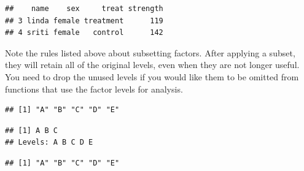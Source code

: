 \documentclass[]{book}
\newenvironment{Shaded}{\begin{snugshade}}{\end{snugshade}}
\newcommand{\DataTypeTok}[1]{\textcolor[rgb]{0.13,0.29,0.53}{#1}}
\newcommand{\DecValTok}[1]{\textcolor[rgb]{0.00,0.00,0.81}{#1}}
\newcommand{\KeywordTok}[1]{\textcolor[rgb]{0.13,0.29,0.53}{\textbf{#1}}}
\newcommand{\NormalTok}[1]{#1}
\newcommand{\OperatorTok}[1]{\textcolor[rgb]{0.81,0.36,0.00}{\textbf{#1}}}
\newcommand{\StringTok}[1]{\textcolor[rgb]{0.31,0.60,0.02}{#1}}
\theoremstyle{definition}
\theoremstyle{definition}
\theoremstyle{definition}
\theoremstyle{remark}
\begin{document}
\begin{verbatim}
##    name    sex     treat strength
## 3 linda female treatment      119
## 4 sriti female   control      142
\end{verbatim}

Note the rules listed above about subsetting factors. After applying a
subset, they will retain all of the original levels, even when they are
not longer useful. You need to drop the unused levels if you would like
them to be omitted from functions that use the factor levels for
analysis.

\begin{Shaded}
\end{Shaded}

\begin{verbatim}
## [1] "A" "B" "C" "D" "E"
\end{verbatim}

\begin{Shaded}
\end{Shaded}

\begin{verbatim}
## [1] A B C
## Levels: A B C D E
\end{verbatim}

\begin{Shaded}
\end{Shaded}

\begin{verbatim}
## [1] "A" "B" "C" "D" "E"
\end{verbatim}
\end{document}
